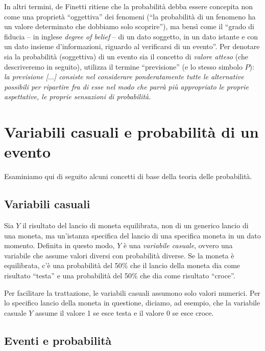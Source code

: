 \documentclass[
  11pt,
]{krantz}
\theoremstyle{definition}
\theoremstyle{definition}
\theoremstyle{definition}
\theoremstyle{definition}
\theoremstyle{remark}
\begin{document}
In altri termini, de Finetti ritiene che la probabilità debba essere concepita non come una proprietà ``oggettiva'' dei fenomeni (``la probabilità di un fenomeno ha un valore determinato che dobbiamo solo scoprire''), ma bensì come il ``grado di fiducia -- in inglese \emph{degree of belief} -- di un dato soggetto, in un dato istante e con un dato insieme d'informazioni, riguardo al verificarsi di un evento''. Per denotare sia la probabilità (soggettiva) di un evento sia il concetto di \emph{valore atteso} (che descriveremo in seguito), \citet{definetti1970teoria} utilizza il termine ``previsione'' (e lo stesso simbolo \(P\)): \emph{la previsione {[}\(\dots\){]} consiste nel considerare ponderatamente tutte le alternative possibili per ripartire fra di esse nel modo che parrà più appropriato le proprie aspettative, le proprie sensazioni di probabilità.}

\hypertarget{variabili-casuali-e-probabilituxe0-di-un-evento}{%
\section{Variabili casuali e probabilità di un evento}\label{variabili-casuali-e-probabilituxe0-di-un-evento}}

Esaminiamo qui di seguito alcuni concetti di base della teoria delle probabilità.

\hypertarget{variabili-casuali-1}{%
\subsection{Variabili casuali}\label{variabili-casuali-1}}

Sia \(Y\) il risultato del lancio di moneta equilibrata, non di un generico lancio di una moneta, ma un'istanza specifica del lancio di una specifica moneta in un dato momento. Definita in questo modo, \(Y\) è una \emph{variabile casuale}, ovvero una variabile che assume valori diversi con probabilità diverse. Se la moneta è equilibrata, c'è una probabilità del 50\% che il lancio della moneta dia come risultato ``testa'' e una probabilità del 50\% che dia come risultato ``croce''.

Per facilitare la trattazione, le variabili casuali assumono solo valori numerici. Per lo specifico lancio della moneta in questione, diciamo, ad esempio, che la variabile casuale \(Y\) assume il valore 1 se esce testa e il valore 0 se esce croce.

\hypertarget{eventi-e-probabilituxe0}{%
\subsection{Eventi e probabilità}\label{eventi-e-probabilituxe0}}
\end{document}
